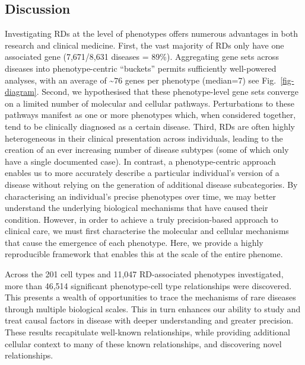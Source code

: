 \documentclass[
]{article}
\begin{document}
\subsection{Discussion}\label{sec-discussion}

Investigating RDs at the level of phenotypes offers numerous advantages
in both research and clinical medicine. First, the vast majority of RDs
only have one associated gene (7,671/8,631 diseases = 89\%). Aggregating
gene sets across diseases into phenotype-centric ``buckets'' permits
sufficiently well-powered analyses, with an average of
\textasciitilde{}\(76\) genes per phenotype (median=7) see
Fig.~\ref{fig-diagram}. Second, we hypothesised that these
phenotype-level gene sets converge on a limited number of molecular and
cellular pathways. Perturbations to these pathways manifest as one or
more phenotypes which, when considered together, tend to be clinically
diagnosed as a certain disease. Third, RDs are often highly
heterogeneous in their clinical presentation across individuals, leading
to the creation of an ever increasing number of disease subtypes (some
of which only have a single documented case). In contrast, a
phenotype-centric approach enables us to more accurately describe a
particular individual's version of a disease without relying on the
generation of additional disease subcategories. By characterising an
individual's precise phenotypes over time, we may better understand the
underlying biological mechanisms that have caused their condition.
However, in order to achieve a truly precision-based approach to
clinical care, we must first characterise the molecular and cellular
mechanisms that cause the emergence of each phenotype. Here, we provide
a highly reproducible framework that enables this at the scale of the
entire phenome.

Across the 201 cell types and 11,047 RD-associated phenotypes
investigated, more than 46,514 significant phenotype-cell type
relationships were discovered. This presents a wealth of opportunities
to trace the mechanisms of rare diseases through multiple biological
scales. This in turn enhances our ability to study and treat causal
factors in disease with deeper understanding and greater precision.
These results recapitulate well-known relationships, while providing
additional cellular context to many of these known relationships, and
discovering novel relationships.
\end{document}
